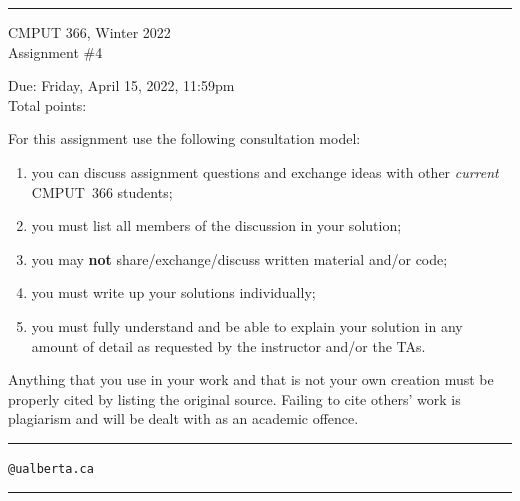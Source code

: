 \documentclass{article}
\newcounter{totalpoints}
\begin{document}
{\bigskip\hrule\bigskip
\huge
\noindent CMPUT 366, Winter 2022\\
Assignment \#4

\large
Due: Friday, April 15, 2022, 11:59pm\\
Total points: 

For this assignment use the following consultation model:
\begin{enumerate}

\item you can discuss assignment questions and exchange ideas with other \emph{current} CMPUT~366 students;

\item you must list all members of the discussion in your solution;

\item you may {\bf not} share/exchange/discuss written material and/or code;

\item you must write up your solutions individually;

\item you must fully understand and be able to explain your solution in any amount of detail as requested by the instructor and/or the TAs.

\end{enumerate}

Anything that you use in your work and that is not your own creation must be properly cited by listing the original source. Failing to cite others' work is plagiarism and will be dealt with as an academic offence.


\bigskip\bigskip\hrule\bigskip

\vspace{1cm}
\hspace{1cm}{\bf First name:} \underline{\hspace{7cm}}

\vspace{1cm}
\hspace{1cm}{\bf Last name:} \underline{\hspace{7cm}}

\vspace{1cm}
\hspace{1cm}{\bf CCID:} \underline{\hspace{5.5cm}}\verb|@ualberta.ca|

\vspace{1cm}
\hspace{1cm}{\bf Collaborators:} \underline{\hspace{6.5cm}}

\vspace{1cm}
\bigskip\hrule\bigskip
}
\end{document}
